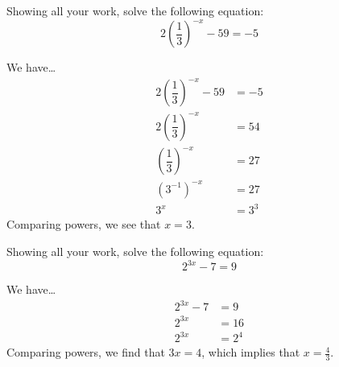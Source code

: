 \documentclass[11pt,letterpaper]{article}
\begin{document}
\newpage



 Showing all your work, solve the following equation:
	\[
	2\left( \dfrac{1}{3} \right)^{-x} - 59= -5
	\] \pspace

\sol We have\dots
	\[
	\begin{aligned}
	2\left( \dfrac{1}{3} \right)^{-x} - 59&= -5 \\[0.3cm]
	2\left( \dfrac{1}{3} \right)^{-x}&= 54 \\[0.3cm]
	\left( \dfrac{1}{3} \right)^{-x}&= 27 \\[0.3cm]
	(3^{-1})^{-x}&= 27 \\[0.3cm]
	3^x&= 3^3
	\end{aligned}
	\]
Comparing powers, we see that $x= 3$. 



\newpage



 Showing all your work, solve the following equation:
	\[
	2^{3x} - 7= 9
	\] \pspace

\sol We have\dots
	\[
	\begin{aligned}
	2^{3x} - 7&= 9 \\[0.3cm]
	2^{3x}&= 16 \\[0.3cm]
	2^{3x}&= 2^4
	\end{aligned}
	\]
Comparing powers, we find that $3x= 4$, which implies that $x= \frac{4}{3}$. 
\end{document}
